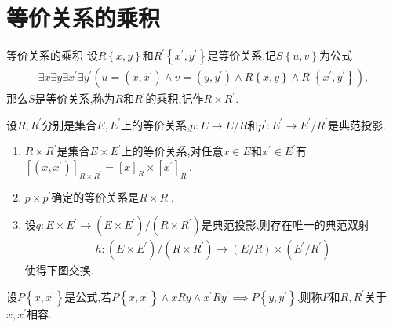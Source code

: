 \section{等价关系的乘积}

\begin{definition}{等价关系的乘积}{}
	设$R\left\{x,y\right\}$和$R^{\prime}\left\{x^{\prime},y^{\prime}\right\}$是等价关系.记$S\left\{u,v\right\}$为公式
	\begin{align*}
		\exists x\exists y\exists x^{\prime}\exists y^{\prime}\left(u=\left(x,x^{\prime}\right)\wedge v=\left(y,y^{\prime}\right)\wedge R\left\{x,y\right\}\wedge R^{\prime}\left\{x^{\prime},y^{\prime}\right\}\right),
	\end{align*}
	那么$S$是等价关系,称为$R$和$R^{\prime}$的乘积,记作$R\times R^{\prime}$.
\end{definition}

\begin{proposition}{}{}
	设$R,R^{\prime}$分别是集合$E,E^{\prime}$上的等价关系,$p:E\to E/R$和$p^{\prime}:E^{\prime}\to E^{\prime}/R^{\prime}$是典范投影.
	\begin{enumerate}
		\item $R\times R^{\prime}$是集合$E\times E^{\prime}$上的等价关系,对任意$x\in E$和$x^{\prime}\in E^{\prime}$有$\left[\left(x,x^{\prime}\right)\right]_{R\times R^{\prime}}=\left[x\right]_{R}\times\left[x^{\prime}\right]_{R^{\prime}}$.
		\item $p\times p^{\prime}$确定的等价关系是$R\times R^{\prime}$.
		\item 设$q:E\times E^{\prime}\to\left(E\times E^{\prime}\right)/\left(R\times R^{\prime}\right)$是典范投影,则存在唯一的典范双射
		\begin{align*}
			h:\left(E\times E^{\prime}\right)/\left(R\times R^{\prime}\right)\to\left(E/R\right)\times\left(E^{\prime}/R^{\prime}\right)
		\end{align*}
		使得下图交换.
		\begin{center}
		\end{center}
	\end{enumerate}
\end{proposition}

\begin{remark}{}{}
	设$P\left\{x,x^{\prime}\right\}$是公式,若$P\left\{x,x^{\prime}\right\}\wedge xRy\wedge x^{\prime}Ry^{\prime}\implies P\left\{y,y^{\prime}\right\}$,则称$P$和$R,R^{\prime}$关于$x,x^{\prime}$相容.
\end{remark}



























